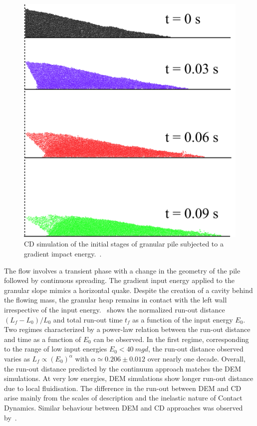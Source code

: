 \begin{figure}
\centering
\includegraphics[width=\textwidth]{Gradient_Slope_CD_200J}
\caption{CD simulation of the initial stages of granular pile subjected to a 
gradient impact 
energy.~\citep{Mutabaruka2013}.}
\label{fig:Gradient_Slope_CD_200J}
\end{figure}

The flow involves a transient phase with a change in the geometry of the pile 
followed by continuous spreading. The gradient input energy applied to the 
granular slope mimics a horizontal quake. Despite the creation 
of a cavity behind the flowing mass, the granular heap remains in 
contact with the left wall irrespective of the input 
energy.~ shows the normalized run-out distance 
$(L_f - L_0)/L_0$ and total run-out time $t_f$ as a function of the input 
energy $E_0$. Two regimes characterized by a power-law relation between 
the run-out distance and time as a function of $E_0$ can be observed. In the 
first regime, corresponding to the range of low input energies $E_0 < 40 \ 
mgd$, the run-out distance observed varies as $L_f \propto (E_0)^\alpha$ with 
$\alpha 
\simeq 0.206 \pm 0.012$ over nearly one decade. Overall, the run-out distance 
predicted by the continuum approach matches the DEM simulations. At very low 
energies, DEM simulations show longer run-out distance due to local 
fluidisation. The difference in the run-out between DEM and CD arise mainly 
from the scales of description and the inelastic nature of Contact Dynamics. 
Similar behaviour between DEM and CD approaches was observed 
by~\citet{Radjai1997}. 


